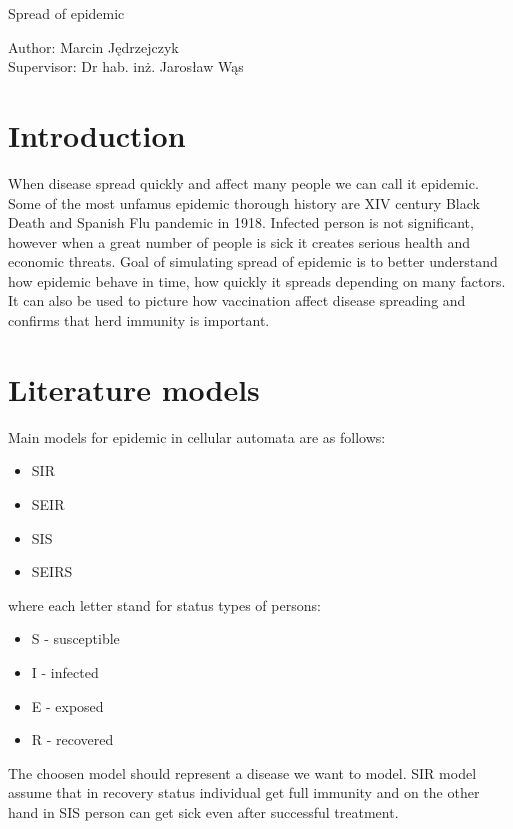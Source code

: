 \documentclass[a4paper, 11pt]{article}
\begin{document}
\renewcommand\refname{Bibliography}
\renewcommand{\figurename}{Figure}
	\begin{center}
			\begin{LARGE}
			Spread of epidemic\\[1cm]
		    \end{LARGE}
	    	\begin{Large}
	    		Author: Marcin Jędrzejczyk \\
	    		Supervisor: Dr hab. inż. Jarosław Wąs\\[1cm]
	    	\end{Large}
	\end{center}

	\section{Introduction}
	When disease spread quickly and affect many people we can call it epidemic. Some of the most unfamus epidemic thorough history are XIV century Black Death and Spanish  Flu pandemic in 1918. Infected person is not significant, however when a great number of people is sick it creates serious health and economic threats. Goal of simulating spread of epidemic is to better understand how epidemic behave in time, how quickly it spreads depending on many factors.\cite{WHITE} It can also be used to picture how vaccination affect disease spreading and confirms that herd immunity is important.
	\section{Literature models}
	Main models for epidemic in cellular automata are as follows:\\
	\begin{itemize}
		\item SIR
		\item SEIR
		\item SIS
		\item SEIRS	
	\end{itemize}
	where each letter stand for status types of persons:
	\begin{itemize}
		\item S - susceptible 
		\item I - infected 
		\item E - exposed
		\item R - recovered
	\end{itemize}
	The choosen model should represent a disease we want to model. SIR model assume that in recovery status individual get full immunity and on the other hand in SIS person can get sick even after successful treatment.\cite{WHITE}\\
	
\end{document}
